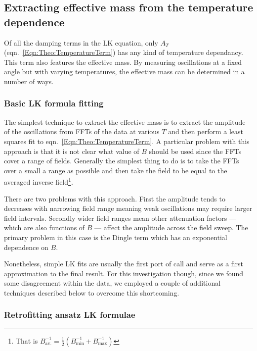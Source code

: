 \subsection{Extracting effective mass from the temperature dependence}
\label{Sec:Exp:ExtractingEffMassTemperatureDependence}

Of all the damping terms in the \ac{LK} equation, only $A_T$ (eqn.~\ref{Eqn:Theo:TemperatureTerm}) has any kind of temperature dependancy. This term also features the effective mass. By measuring oscillations at a fixed angle but with varying temperatures, the effective mass can be determined in a number of ways.

\subsubsection{Basic \ac{LK} formula fitting}

The simplest technique to extract the effective mass is to extract the amplitude of the oscillations from \acp{FFT} of the data at various $T$ and then perform a least squares fit to eqn.~\ref{Eqn:Theo:TemperatureTerm}. A particular problem with this approach is that it is not clear what value of $B$ should be used since the \acp{FFT} cover a range of fields. Generally the simplest thing to do is to take the \acp{FFT} over a small a range as possible and then take the field to be equal to the averaged inverse field\footnote{That is $B_{\textrm{av.}}^{-1} = \frac{1}{2}(B_{\textrm{min}}^{-1} + B_{\textrm{max}}^{-1})$}. 

There are two problems with this approach. First the amplitude tends to decreases with narrowing field range meaning weak oscillations may require larger field intervals. Secondly wider field ranges mean other attenuation factors --- which are also functions of $B$ --- affect the amplitude across the field sweep. The primary problem in this case is the Dingle term which has an exponential dependence on $B$.

Nonetheless, simple \ac{LK} fits are usually the first port of call and serve as a first approximation to the final result. For this investigation though, since we found some disagreement within the data, we employed a couple of additional techniques described below to overcome this shortcoming.

\subsubsection{Retrofitting ansatz \ac{LK} formulae}
\label{Sec:Exp:LKRetrofitting}


